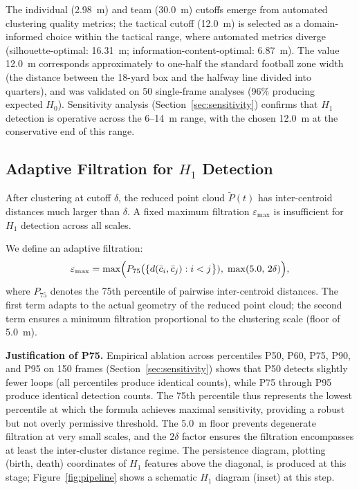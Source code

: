 The individual (2.98~m) and team (30.0~m) cutoffs emerge from automated clustering quality metrics; the tactical cutoff (12.0~m) is selected as a domain-informed choice within the tactical range, where automated metrics diverge (silhouette-optimal: 16.31~m; information-content-optimal: 6.87~m). The value 12.0~m corresponds approximately to one-half the standard football zone width (the distance between the 18-yard box and the halfway line divided into quarters), and was validated on 50 single-frame analyses (96\% producing expected \(H_0\)). Sensitivity analysis (Section~\ref{sec:sensitivity}) confirms that \(H_1\) detection is operative across the 6--14~m range, with the chosen 12.0~m at the conservative end of this range.

\subsection{Adaptive Filtration for \(H_1\) Detection}
\label{sec:adaptive}

After clustering at cutoff \(\delta\), the reduced point cloud \(\tilde P(t)\) has inter-centroid distances much larger than \(\delta\). A fixed maximum filtration \(\varepsilon_{\max}\) is insufficient for \(H_1\) detection across all scales.

We define an adaptive filtration:
\begin{equation}
  \varepsilon_{\max}=\max\Bigl(
    P_{75}\bigl(\{d(\bar c_i,\bar c_j): i<j\bigr\}),\;
    \max(5.0,\,2\delta)
  \Bigr), \label{eq:adaptive}
\end{equation}
where \(P_{75}\) denotes the 75th percentile of pairwise inter-centroid distances. The first term adapts to the actual geometry of the reduced point cloud; the second term ensures a minimum filtration proportional to the clustering scale (floor of 5.0~m).

\textbf{Justification of P75.} Empirical ablation across percentiles P50, P60, P75, P90, and P95 on 150 frames (Section~\ref{sec:sensitivity}) shows that P50 detects slightly fewer loops (all percentiles produce identical counts), while P75 through P95 produce identical detection counts. The 75th percentile thus represents the lowest percentile at which the formula achieves maximal sensitivity, providing a robust but not overly permissive threshold. The 5.0~m floor prevents degenerate filtration at very small scales, and the \(2\delta\) factor ensures the filtration encompasses at least the inter-cluster distance regime. The persistence diagram, plotting (birth, death) coordinates of \(H_1\) features above the diagonal, is produced at this stage; Figure~\ref{fig:pipeline} shows a schematic \(H_1\) diagram (inset) at this step.

